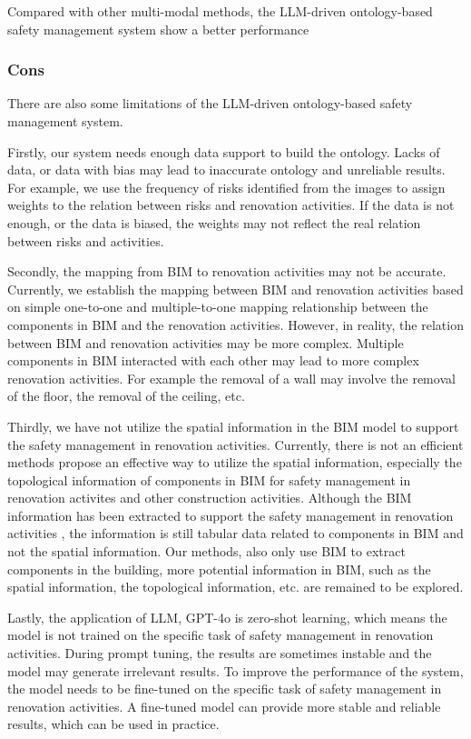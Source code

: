 Compared with other multi-modal methods, the LLM-driven ontology-based safety management system show a better performance
\subsubsection{Cons}
There are also some limitations of the LLM-driven ontology-based safety management system.

Firstly, our system needs enough data support to build the ontology. Lacks of data, or data with bias 
may lead to inaccurate ontology and unreliable results. 
For example, we use the frequency of risks identified from the images to assign weights to the relation between risks and renovation activities.
If the data is not enough, or the data is biased, the weights may not reflect the real relation between risks and activities.

Secondly, the mapping from BIM to renovation activities may not be accurate. 
Currently, we establish the mapping between BIM and renovation activities based on simple one-to-one and multiple-to-one mapping relationship
between the components in BIM and the renovation activities.
 However, in reality, the relation between BIM and renovation activities may be more complex. Multiple components in BIM interacted with each other may lead to more complex renovation activities.
 For example the removal of a wall may involve the removal of the floor, the removal of the ceiling, etc.

 Thirdly, we have not utilize the spatial information in the BIM model to support the safety management in renovation activities.
 Currently, there is not an efficient methods propose an effective way to utilize the spatial information, especially the topological information of components in BIM for safety management in renovation activites and other construction activities. 
 Although the BIM information has been extracted to support the safety management in renovation activities \cite[]{doukari2024ontology,shen2022bim}, the information is still tabular data related to components in BIM and not the spatial information.
Our methods, also only use BIM to extract components in the building, more potential information in BIM, such as the spatial information, the topological information, etc. are remained to be explored.

Lastly, the application of LLM, GPT-4o is zero-shot learning, which means the model is not trained on the specific task of safety management in renovation activities.
During prompt tuning, the results are sometimes instable and the model may generate irrelevant results. 
To improve the performance of the system, the model needs to be fine-tuned on the specific task of safety management in renovation activities.
A fine-tuned model can provide more stable and reliable results, which can be used in practice.


